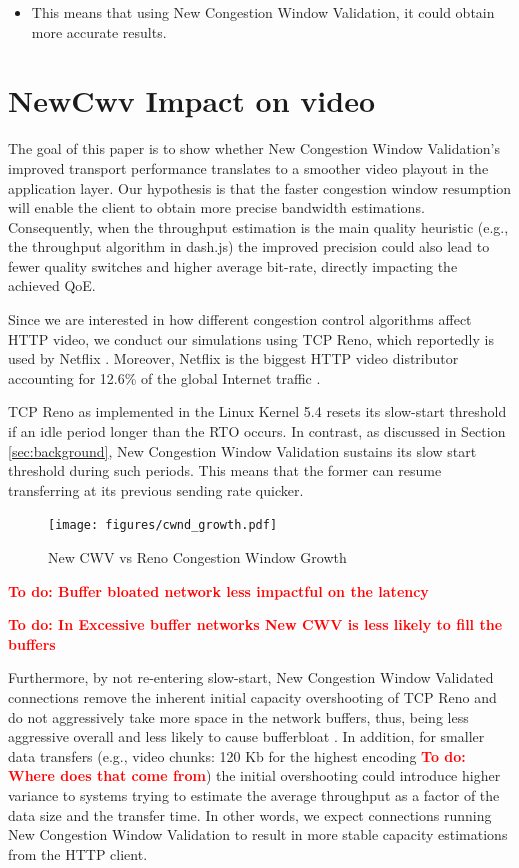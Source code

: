 \documentclass[10pt,sigconf]{acmart}
\newcommand{\todo}[1]{\textbf{\textcolor{red}{To do: #1}}}
\begin{document}
\begin{itemize}
    \item This means that using New Congestion Window Validation, it could obtain more accurate results.
\end{itemize}

\section{NewCwv Impact on video}
\label{sec:newcwv-impact}

The goal of this paper is to show whether New Congestion Window Validation's improved transport performance translates to a smoother video playout in the application layer. Our hypothesis is that the faster congestion window resumption will enable the client to obtain more precise bandwidth estimations. Consequently, when the throughput estimation is the main quality heuristic (e.g., the throughput algorithm in dash.js) the improved precision could also lead to fewer quality switches and higher average bit-rate, directly impacting the achieved QoE.

Since we are interested in how different congestion control algorithms affect HTTP video, we conduct our simulations using TCP Reno, which reportedly is used by Netflix \cite{Mishra-2019-the-great-internet-tcp-congestion-control-census}. Moreover, Netflix is the biggest HTTP video distributor accounting for 12.6\% of the global Internet traffic \cite{Sandvine-2019-global-internet-report}.

TCP Reno as implemented in the Linux Kernel 5.4 resets its slow-start threshold if an idle period longer than the RTO occurs. In contrast, as discussed in Section \ref{sec:background}, New Congestion Window Validation sustains its slow start threshold during such periods. This means that the former can resume transferring at its previous sending rate quicker.

\begin{figure}
  \centering
  \texttt{[image: figures/cwnd\_growth.pdf]}
  \caption{New CWV vs Reno Congestion Window Growth}
  \label{fig:cwnd-growth}
\end{figure}


\todo{Buffer bloated network less impactful on the latency}

\todo{In Excessive buffer networks New CWV is less likely to fill the buffers}

Furthermore, by not re-entering slow-start, New Congestion Window Validated connections remove the inherent initial capacity overshooting of TCP Reno and do not aggressively take more space in the network buffers, thus, being less aggressive overall and less likely to cause bufferbloat \cite{Gettys-2011-bufferbloat}. In addition, for smaller data transfers (e.g., video chunks: 120 Kb for the highest encoding \todo{Where does that come from}) the initial overshooting could introduce higher variance to systems trying to estimate the average throughput as a factor of the data size and the transfer time. In other words, we expect connections running New Congestion Window Validation to result in more stable capacity estimations from the HTTP client.
\end{document}
